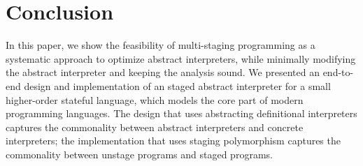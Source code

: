 \section{Conclusion}

In this paper, we show the feasibility of multi-staging programming as a systematic approach
to optimize abstract interpreters, while minimally modifying the abstract interpreter and keeping
the analysis sound.
We presented an end-to-end design and implementation
of an staged abstract interpreter for a small higher-order stateful language, which
models the core part of modern programming languages.
The design that uses abstracting definitional interpreters captures the commonality between
abstract interpreters and concrete interpreters; the implementation that uses staging polymorphism
captures the commonality between unstage programs and staged programs.
